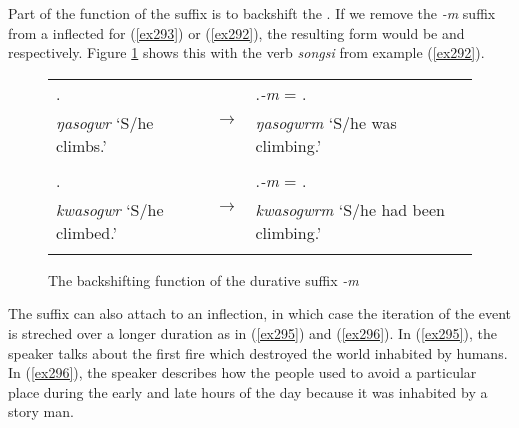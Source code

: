 Part of the function of the  suffix is to backshift the . If we remove the \emph{-m} suffix from a  inflected for   (\ref{ex293}) or   (\ref{ex292}), the resulting form would be   and   respectively. Figure \ref{backshiftdur} shows this with the verb \emph{songsi} from example (\ref{ex292}).

\begin{figure}[h]
\centering
	\begin{tabular}{|l|l|l|}
		\cline{1-1} \cline{3-3}
		\Nonpast.\Ipfv &\multirow{2}{*}{$\rightarrow$}& \Nonpast.\Ipfv\emph{-m} = \Rpst.\Dur\\
		\emph{ŋasogwr} `S/he climbs.' && \emph{ŋasogwrm} `S/he was climbing.'\\
		\cline{1-1} \cline{3-3}
		\multicolumn{3}{c}{}\\
		\cline{1-1} \cline{3-3}
		\Rpst.\Ipfv &\multirow{2}{*}{$\rightarrow$}& \Rpst.\Ipfv\emph{-m} = \Pst.\Dur\\
		\emph{kwasogwr} `S/he climbed.' && \emph{kwasogwrm} `S/he had been climbing.'\\
		\cline{1-1} \cline{3-3}
		\multicolumn{3}{c}{}\\
	\end{tabular}
\caption{The backshifting function of the durative suffix \emph{-m}}
\label{backshiftdur}
\end{figure}%

The  suffix can also attach to an  inflection, in which case the iteration of the event is streched over a longer duration as in (\ref{ex295}) and (\ref{ex296}). In (\ref{ex295}), the speaker talks about the first fire which destroyed the world inhabited by humans. In (\ref{ex296}), the speaker describes how the people used to avoid a particular place during the early and late hours of the day because it was inhabited by a story man.

